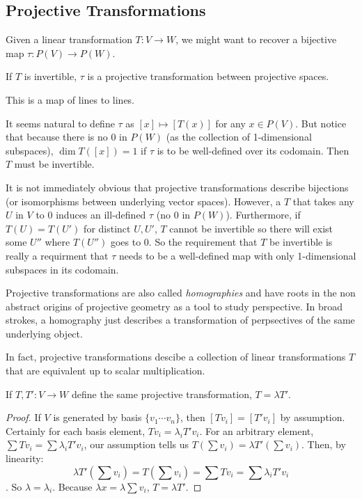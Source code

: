 \documentclass[10pt]{article}
\begin{document}

\subsection{Projective Transformations}

Given a linear transformation $T: V \to W$, we might want to recover a bijective map $\tau: P(V) \to P(W)$.

\begin{definition}
	If $T$ is invertible, $\tau$ is a projective transformation between
	projective spaces.
\end{definition}

This is a map of lines to lines.

It seems natural to define $\tau$ as $[x] \mapsto [T(x)]$ for any $x \in P(V)$.
But notice that because there is no $0$ in $P(W)$ (as the collection of 1-dimensional subspaces), 
$\dim T([x]) = 1$ if $\tau$ is to be well-defined over its codomain. Then $T$
must be invertible.

\begin{note}
	It is not immediately obvious that projective transformations describe
	bijections (or isomorphisms between underlying vector spaces). However, a $T$
	that takes any $U$ in $V$ to $0$ induces an ill-defined $\tau$ (no $0$ in
	$P(W)$). Furthermore, if $T(U) = T(U')$ for distinct $U, U'$, $T$ cannot be
	invertible so there will exist some $U''$ where $T(U'')$ goes to $0$. So the
	requirement that $T$ be invertible is really a requirment that $\tau$ needs
	to be a well-defined map with only 1-dimensional subspaces in its codomain.
\end{note}

\begin{note}
	Projective transformations are also called
	\textit{homographies} and have roots
	in the non abstract origins of projective geometry as a tool to study
	perspective. In broad strokes, a homography just describes a
	transformation of perpsectives of the same underlying object.
\end{note}

In fact, projective transformations descibe a collection of linear
transformations $T$ that are equivalent up to scalar multiplication.

\begin{proposition}
	If $T, T': V \to W$ define the same projective transformation, $T = \lambda T'$.
\end{proposition}

\begin{proof}
	If $V$ is generated by basis $\{ v_1 \cdots v_n \}$, then $[Tv_i] = [T'v_i]$
	by assumption. Certainly for each basis element, $Tv_i = \lambda_i T'v_i$.
	For an arbitrary element, $\sum Tv_i = \sum \lambda_i T'v_i$, our assumption tells us $T(\sum v_i) = \lambda
	T'(\sum v_i)$.
	Then, by linearity: \[ \lambda T'(\sum v_i) = T(\sum v_i) = \sum Tv_i = \sum \lambda_i T'v_i\].
	So $\lambda = \lambda_i$. Because $\lambda x = \lambda \sum v_i$, $T = \lambda T'$.
\end{proof}
\end{document}
